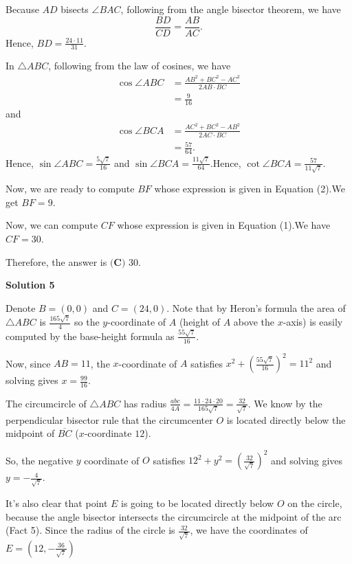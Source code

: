 \begin{enumerate}
 Because $AD$ bisects $\angle BAC$, following from the angle bisector theorem, we have
 \[ \frac{BD}{CD} = \frac{AB}{AC} . \]Hence, $BD = \frac{24 \cdot 11}{31}$.

 In $\triangle ABC$, following from the law of cosines, we have
 \begin{align*} \cos \angle ABC & = \frac{AB^2 + BC^2 - AC^2}{2 AB \cdot BC} \\ & = \frac{9}{16} \end{align*}
and
 \begin{align*} \cos \angle BCA & = \frac{AC^2 + BC^2 - AB^2}{2 AC \cdot BC} \\ & = \frac{57}{64} . \end{align*}
Hence, $\sin \angle ABC = \frac{5 \sqrt{7}}{16}$ and $\sin \angle BCA = \frac{11 \sqrt{7}}{64}$.Hence, $\cot \angle BCA = \frac{57}{11 \sqrt{7}}$.

 Now, we are ready to compute $BF$ whose expression is given in Equation (2).We get $BF = 9$.

 Now, we can compute $CF$ whose expression is given in Equation (1).We have $CF = 30$.

 Therefore, the answer is $\boxed{\textbf{(C) }30}$.

 



\textbf{Solution 5}

Denote $B=(0, 0)$ and $C=(24, 0)$. Note that by Heron's formula the area of $\triangle ABC$ is $\frac{165\sqrt{7}}{4}$ so the $y$-coordinate of $A$ (height of $A$ above the $x$-axis) is easily computed by the base-height formula as $\frac{55\sqrt7}{16}$.

 Now, since $AB=11$, the $x$-coordinate of $A$ satisfies $x^2+(\frac{55\sqrt7}{16})^2=11^2$ and solving gives $x=\frac{99}{16}$.

 The circumcircle of $\triangle ABC$ has radius $\frac{abc}{4A}=\frac{11\cdot 24\cdot 20}{165\sqrt7}=\frac{32}{\sqrt7}$. We know by the perpendicular bisector rule that the circumcenter $O$ is located directly below the midpoint of $\overline{BC}$ ($x$-coordinate $12$).

 So, the negative $y$ coordinate of $O$ satisfies $12^2+y^2=(\frac{32}{\sqrt7})^2$ and solving gives $y=-\frac{4}{\sqrt7}$.

 It's also clear that point $E$ is going to be located directly below $O$ on the circle, because the angle bisector intersects the circumcircle at the midpoint of the arc (Fact 5). Since the radius of the circle is $\frac{32}{\sqrt7}$, we have the coordinates of $E=(12, -\frac{36}{\sqrt7})$


\end{enumerate}
